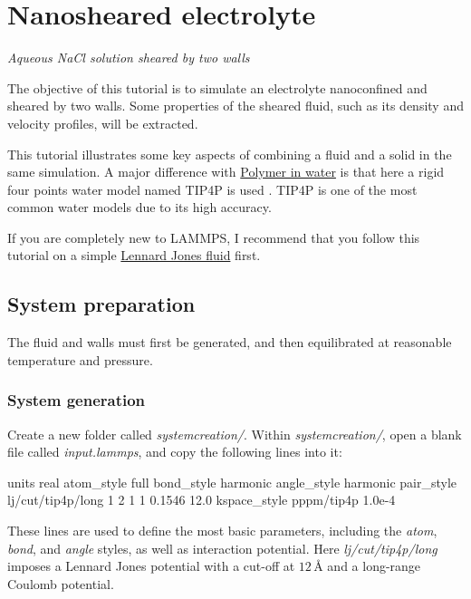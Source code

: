 \chapter{Nanosheared electrolyte}
\label{sheared-confined-label}

\noindent \vspace{-1cm} \noindent \textcolor{graytitle}{\textit{{\Large Aqueous NaCl solution sheared by two walls}}\vspace{0.5cm} }

\vspace{0.25cm} \noindent The objective of this tutorial is to
simulate an electrolyte nanoconfined and sheared by two walls.
Some properties of the sheared fluid, such as its
density and velocity profiles, will be extracted. 

\vspace{0.25cm} \noindent This tutorial illustrates some key aspects of
combining a fluid and a solid in the same simulation.
A major difference with \hyperref[all-atoms-label]{Polymer in water} is that
here a rigid four points water model named TIP4P is used \cite{abascal2005general}.
TIP4P is one of the most common water models due to its high accuracy.

\vspace{0.25cm} \noindent If you are completely new to LAMMPS, I recommend that
you follow this tutorial on a simple \hyperref[lennard-jones-label]{Lennard Jones fluid} first.

\section{System preparation}
\noindent The fluid and walls must first be generated, and then
equilibrated at reasonable temperature and pressure.

\subsection{System generation}
\noindent Create a new folder called \textit{systemcreation/}.
Within \textit{systemcreation/}, open a blank file
called \textit{input.lammps}, and copy the following
lines into it:

\begin{lcverbatim}
units real
atom_style full
bond_style harmonic
angle_style harmonic
pair_style lj/cut/tip4p/long 1 2 1 1 0.1546 12.0
kspace_style pppm/tip4p 1.0e-4
\end{lcverbatim}

\noindent These lines are used to define the most basic parameters,
including the \textit{atom}, \textit{bond}, and \textit{angle} styles, as well as 
interaction potential. Here \textit{lj/cut/tip4p/long} imposes
a Lennard Jones potential with a cut-off at $12\,\text{$\text{\AA{}}$}$
and a long-range Coulomb potential. 

